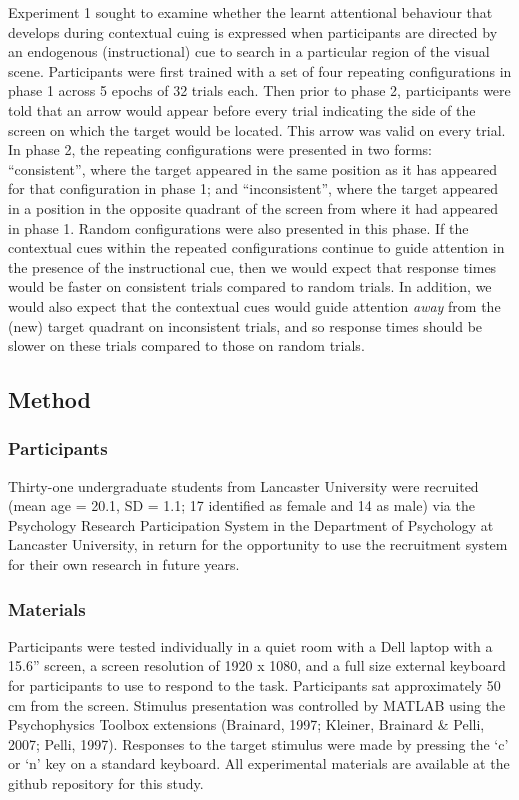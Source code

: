 \documentclass[
  man,
  floatsintext,
  longtable,
  nolmodern,
  notxfonts,
  notimes,
  colorlinks=true,linkcolor=blue,citecolor=blue,urlcolor=blue]{apa7}
\begin{document}
Experiment 1 sought to examine whether the learnt attentional behaviour
that develops during contextual cuing is expressed when participants are
directed by an endogenous (instructional) cue to search in a particular
region of the visual scene. Participants were first trained with a set
of four repeating configurations in phase 1 across 5 epochs of 32 trials
each. Then prior to phase 2, participants were told that an arrow would
appear before every trial indicating the side of the screen on which the
target would be located. This arrow was valid on every trial. In phase
2, the repeating configurations were presented in two forms:
``consistent'', where the target appeared in the same position as it has
appeared for that configuration in phase 1; and ``inconsistent'', where
the target appeared in a position in the opposite quadrant of the screen
from where it had appeared in phase 1. Random configurations were also
presented in this phase. If the contextual cues within the repeated
configurations continue to guide attention in the presence of the
instructional cue, then we would expect that response times would be
faster on consistent trials compared to random trials. In addition, we
would also expect that the contextual cues would guide attention
\emph{away} from the (new) target quadrant on inconsistent trials, and
so response times should be slower on these trials compared to those on
random trials.

\subsection{Method}\label{method}

\subsubsection{Participants}\label{participants}

Thirty-one undergraduate students from Lancaster University were
recruited (mean age = 20.1, SD = 1.1; 17 identified as female and 14 as
male) via the Psychology Research Participation System in the Department
of Psychology at Lancaster University, in return for the opportunity to
use the recruitment system for their own research in future years.

\subsubsection{Materials}\label{materials}

Participants were tested individually in a quiet room with a Dell laptop
with a 15.6'' screen, a screen resolution of 1920 x 1080, and a full
size external keyboard for participants to use to respond to the task.
Participants sat approximately 50 cm from the screen. Stimulus
presentation was controlled by MATLAB using the Psychophysics Toolbox
extensions (Brainard, 1997; Kleiner, Brainard \& Pelli, 2007; Pelli,
1997). Responses to the target stimulus were made by pressing the `c' or
`n' key on a standard keyboard. All experimental materials are available
at the github repository for this study.
\end{document}
